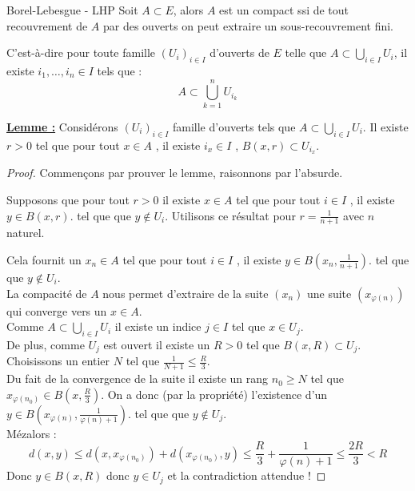 \begin{definition}{Borel-Lebesgue - LHP}{}
    Soit $A \subset E$, alors
    $A$ est un compact ssi de tout recouvrement de $A$ par des ouverts on peut extraire un sous-recouvrement fini.

    C'est-à-dire pour toute famille $(U_i)_{i \in I}$ d'ouverts de $E$ 
    telle que $\displaystyle A \subset \bigcup_{i \in I} U_i$, il existe $i_1, \ldots, i_n \in I$ tels que :
    \[A \subset \bigcup_{k=1}^n U_{i_k}\]
\end{definition}

\uline{{\bf Lemme  :}}
Considérons $(U_i)_{i \in I}$ famille d'ouverts tels que $A \subset \bigcup_{i \in I} U_i$.
 Il existe $r>0$ tel que pour tout $x\in A$ , il existe $i_{x} \in I$ , $B(x,r) \subset U_{i_x}$.

\begin{proof}
Commençons par prouver le lemme, raisonnons par l'absurde.

Supposons que pour tout $r>0$ il existe $x\in A$ tel que pour tout $i \in I$ , il existe $y\in B(x,r)$. tel que que $y \notin U_i$.
Utilisons ce résultat pour $r=\frac 1{n+1}$ avec $n$ naturel.

Cela fournit un $x_n \in A$ tel que pour tout $i \in I$ , il existe $y\in B\left(x_n,\frac 1{n+1}\right)$. tel que que $y \notin U_i$. \\

La compacité de $A$ nous permet d'extraire de la suite $(x_n)$ une suite $(x_{\varphi(n)})$ qui converge vers un $x\in A$.\\

Comme $A \subset \bigcup_{i \in I} U_i$ il existe un indice $j \in I$ tel que $x \in U_j$.\\
De plus,  comme $U_j$ est ouvert il existe un $R>0$ tel que $B(x,R) \subset U_j$.\\

Choisissons un entier $N$ tel que $\frac 1{N+1}\leqslant \frac R 3$.\\
Du fait de la convergence de la suite il existe un rang $n_0\geqslant N $ tel que $x_{\varphi(n_0)} \in B\left(x,\frac R 3\right)$.
On a donc (par la propriété) l'existence d'un $y \in B\left(x_{\varphi(n)},\frac 1{\varphi(n)+1}\right)$. tel que que $y \notin U_j$.\\
Mézalors :
\[d(x,y) \leqslant d(x,x_{\varphi(n_0)})+d(x_{\varphi(n_0)},y) \leqslant \frac R 3 + \frac 1{\varphi(n)+1}\leqslant \frac {2R}3 <R\]
Donc $y \in B(x,R)$ donc $y \in U_j$ et la contradiction attendue !
\end{proof}

